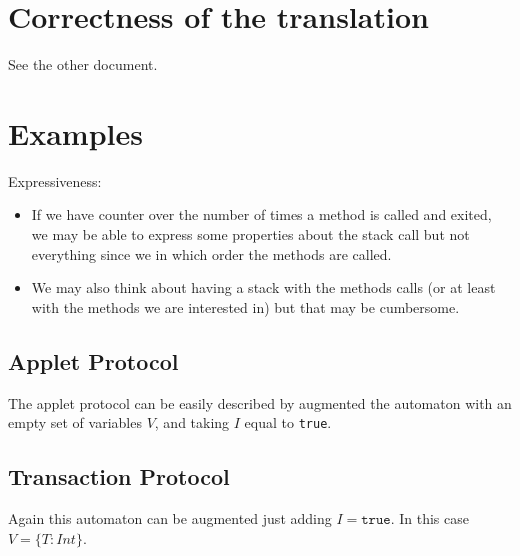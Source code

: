 \documentclass[a4paper,10pt]{article}
\theoremstyle{definition}
\begin{document}

\section{Correctness of the translation}
See the other document.

\section{Examples}
Expressiveness:
\begin{itemize}
  \item If we have counter over the number of times a method is called and exited, we may be able to express
some properties about the stack call but not everything since we in which order the methods are called.
  \item We may also think about having a stack with the methods calls (or at least with the methods we are
interested in) but that may be cumbersome.
\end{itemize}

\subsection*{Applet Protocol}
The applet protocol can be easily described by augmented the automaton with an empty set of variables $V$, and
taking $I$ equal to \texttt{true}.

\subsection*{Transaction Protocol}
Again this automaton can be augmented just adding $I = \texttt{true}$. In this case $V = \{T \colon Int\}$.
\end{document}
